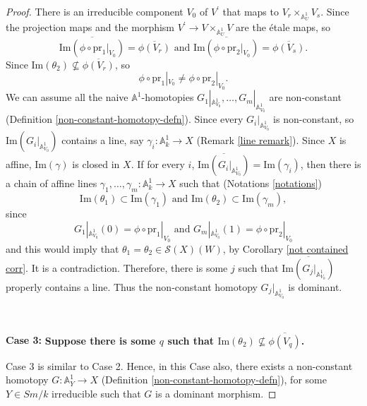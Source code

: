 \documentclass[11pt, reqno]{amsart}
\theoremstyle{plain}
\theoremstyle{definition}
\newcommand{\A}{{\mathbb A}}
\begin{document}
\begin{proof}
There is an irreducible component $V_0$ of $V^\prime$ that maps to $V_r \times_{\mathbb{A}^1_U} V_s$. Since the projection maps and the morphism $V^{\prime} \to V \times_{\mathbb{A}^1_U} V$ are the \'etale maps, so 
$$\overline{\text{Im}(\phi \circ \text{pr}_1|_{V_0})} = \overline{\phi(V_r)} \text{ and } \overline{\text{Im}(\phi \circ \text{pr}_2|_{V_0})} = \overline{\phi(V_s)}.$$
Since $\text{Im}(\theta_2) \nsubseteq \overline{\phi(V_r)}$, so
$$\phi \circ \text{pr}_1|_{V_0} \neq \phi \circ \text{pr}_2|_{V_0}.$$
We can assume all the naive $\mathbb{A}^1$-homotopies $G_1|_{\mathbb{A}^1_{V_0}}, \dots, G_m|_{\mathbb{A}^1_{V_0}}$ are non-constant (Definition \ref{non-constant-homotopy-defn}). Since every $G_i|_{\mathbb{A}^1_{V_0}}$ is non-constant, so $\text{Im}(G_i|_{\mathbb{A}^1_{V_0}})$ contains a line, say $\gamma_i: \A^1_k \to X$ (Remark \ref{line remark}). Since $X$ is affine, $\text{Im}(\gamma)$ is closed in $X$. If for every $i$, $\overline{\text{Im}(G_i|_{\mathbb{A}^1_{V_0}})} = \text{Im}(\gamma_i)$, 
then there is a chain of affine lines $\gamma_1, \dots, \gamma_m: \A^1_k \to X$ such that (Notations \ref{notations})
$$\text{Im}(\theta_1) \subset \text{Im}(\gamma_1) \text{ and } \text{Im}(\theta_2) \subset \text{Im}(\gamma_m),$$
since
$$G_1|_{\mathbb{A}^1_{V_0}}(0) = \phi \circ \text{pr}_1|_{V_0} \text{ and } G_m|_{\mathbb{A}^1_{V_0}}(1) = \phi \circ \text{pr}_2|_{V_0}$$ 
and this would imply that $\theta_1 = \theta_2 \in \mathcal{S}(X)(W)$, by Corollary \ref{not contained corr}. It is a contradiction. Therefore, there is some $j$ such that $\overline{\text{Im}(G_j|_{\mathbb{A}^1_{V_0}})}$ properly contains a line. Thus the non-constant homotopy $G_j|_{\mathbb{A}^1_{V_0}}$ is dominant. 

\

\textbf{Case 3:} \textbf{Suppose there is some $q$ such that $\text{Im}(\theta_2) \nsubseteq \overline{\phi(V_q)}$.}

Case 3 is similar to Case 2. Hence, in this Case also, there exists a non-constant homotopy $G: \A^1_Y \to X$ (Definition \ref{non-constant-homotopy-defn}), for some $Y \in Sm/k$ irreducible such that $G$ is a dominant morphism.


\end{proof}
\end{document}
